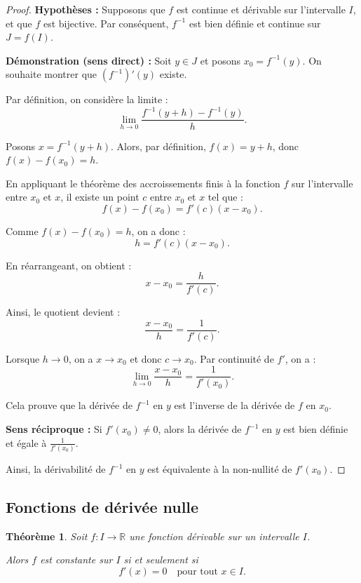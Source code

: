 \documentclass{report} %
\theoremstyle{definition}  %
\theoremstyle{plain} %
\newtheorem{theorem}{Théorème}[chapter]
\theoremstyle{remark} %
\begin{document}
\medskip

\begin{proof}
\textbf{Hypothèses :}  
Supposons que \( f \) est continue et dérivable sur l’intervalle \( I \), et que \( f \) est bijective. Par conséquent, \( f^{-1} \) est bien définie et continue sur \( J = f(I) \).

\medskip
\textbf{Démonstration (sens direct) :}
Soit \( y \in J \) et posons \( x_0 = f^{-1}(y) \). On souhaite montrer que \( (f^{-1})'(y) \) existe.

Par définition, on considère la limite :
\[
\lim_{h \to 0} \frac{f^{-1}(y+h) - f^{-1}(y)}{h}.
\]

Posons \( x = f^{-1}(y+h) \). Alors, par définition, \( f(x) = y + h \), donc \( f(x) - f(x_0) = h \).

En appliquant le théorème des accroissements finis à la fonction \( f \) sur l’intervalle entre \( x_0 \) et \( x \), il existe un point \( c \) entre \( x_0 \) et \( x \) tel que :
\[
f(x) - f(x_0) = f'(c)(x - x_0).
\]

Comme \( f(x) - f(x_0) = h \), on a donc :
\[
h = f'(c)(x - x_0).
\]

En réarrangeant, on obtient :
\[
x - x_0 = \frac{h}{f'(c)}.
\]

Ainsi, le quotient devient :
\[
\frac{x - x_0}{h} = \frac{1}{f'(c)}.
\]

Lorsque \( h \to 0 \), on a \( x \to x_0 \) et donc \( c \to x_0 \). Par continuité de \( f' \), on a :
\[
\lim_{h \to 0} \frac{x - x_0}{h} = \frac{1}{f'(x_0)}.
\]

Cela prouve que la dérivée de \( f^{-1} \) en \( y \) est l’inverse de la dérivée de \( f \) en \( x_0 \).

\medskip
\textbf{Sens réciproque :}  
Si \( f'(x_0) \neq 0 \), alors la dérivée de \( f^{-1} \) en \( y \) est bien définie et égale à \( \frac{1}{f'(x_0)} \).

Ainsi, la dérivabilité de \( f^{-1} \) en \( y \) est équivalente à la non-nullité de \( f'(x_0) \).

\end{proof}


\medskip

\subsection{Fonctions de dérivée nulle}

\begin{theorem}
Soit \(f : I \to \mathbb{R}\) une fonction dérivable sur un intervalle \(I\).  

Alors \(f\) est constante sur \(I\) si et seulement si
\[
f'(x) = 0 \quad \text{pour tout } x \in I.
\]
\end{theorem}
\end{document}
